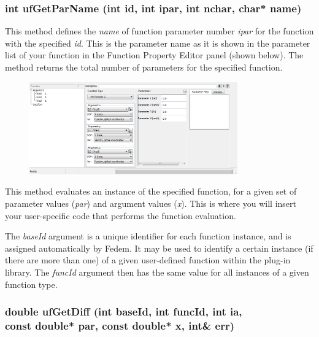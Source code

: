 \subsubsection{int ufGetParName (int id, int ipar, int nchar, char* name)}

This method defines the {\sl name} of function parameter number {\sl ipar}
for the function with the specified {\sl id}. This is the parameter name as it
is shown in the parameter list of your function in the Function Property Editor
panel (shown below). The method returns the total number of parameters for the
specified function.

\begin{figure}[!h]
  \center\includegraphics[trim=185 96 20 0,clip,width=0.8\textwidth]{Figures/2-ArgumentsAndParameters}
\end{figure}


This method evaluates an instance of the specified function, for a given set of
parameter values ({\sl par}) and argument values ({\sl x}).
This is where you will insert your user-specific code that performs the
function evaluation.

The {\sl baseId} argument is a unique identifier for each function instance,
and is assigned automatically by Fedem. It may be used to identify a certain
instance (if there are more than one) of a given user-defined function within
the plug-in library. The {\sl funcId} argument then has the same value for all
instances of a given function type.

\subsubsection{double ufGetDiff (int baseId, int funcId, int ia, \\
  const double* par, const double* x, int\& err)}

